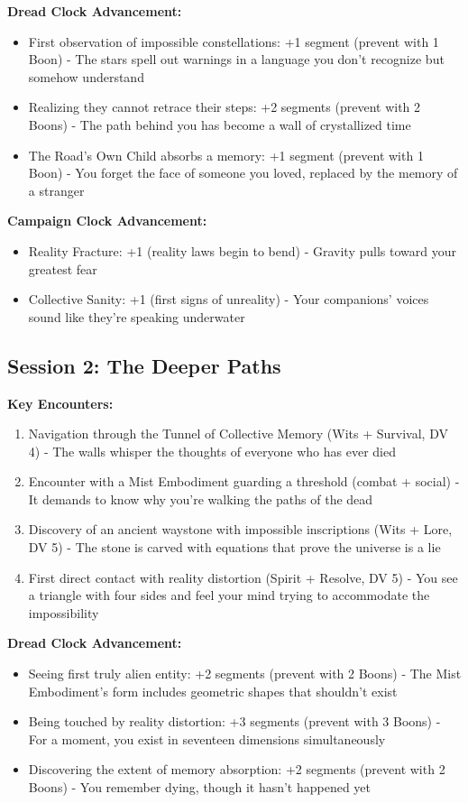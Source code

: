 \documentclass[11pt]{article}
\begin{document}
\textbf{Dread Clock Advancement:}
\begin{itemize}
\item First observation of impossible constellations: +1 segment (prevent with 1 Boon) - The stars spell out warnings in a language you don't recognize but somehow understand
\item Realizing they cannot retrace their steps: +2 segments (prevent with 2 Boons) - The path behind you has become a wall of crystallized time
\item The Road's Own Child absorbs a memory: +1 segment (prevent with 1 Boon) - You forget the face of someone you loved, replaced by the memory of a stranger
\end{itemize}

\textbf{Campaign Clock Advancement:}
\begin{itemize}
\item Reality Fracture: +1 (reality laws begin to bend) - Gravity pulls toward your greatest fear
\item Collective Sanity: +1 (first signs of unreality) - Your companions' voices sound like they're speaking underwater
\end{itemize}

\subsection{Session 2: The Deeper Paths}

\textbf{Key Encounters:}
\begin{enumerate}
\item Navigation through the Tunnel of Collective Memory (Wits + Survival, DV 4) - The walls whisper the thoughts of everyone who has ever died
\item Encounter with a Mist Embodiment guarding a threshold (combat + social) - It demands to know why you're walking the paths of the dead
\item Discovery of an ancient waystone with impossible inscriptions (Wits + Lore, DV 5) - The stone is carved with equations that prove the universe is a lie
\item First direct contact with reality distortion (Spirit + Resolve, DV 5) - You see a triangle with four sides and feel your mind trying to accommodate the impossibility
\end{enumerate}

\textbf{Dread Clock Advancement:}
\begin{itemize}
\item Seeing first truly alien entity: +2 segments (prevent with 2 Boons) - The Mist Embodiment's form includes geometric shapes that shouldn't exist
\item Being touched by reality distortion: +3 segments (prevent with 3 Boons) - For a moment, you exist in seventeen dimensions simultaneously
\item Discovering the extent of memory absorption: +2 segments (prevent with 2 Boons) - You remember dying, though it hasn't happened yet
\end{itemize}
\end{document}
